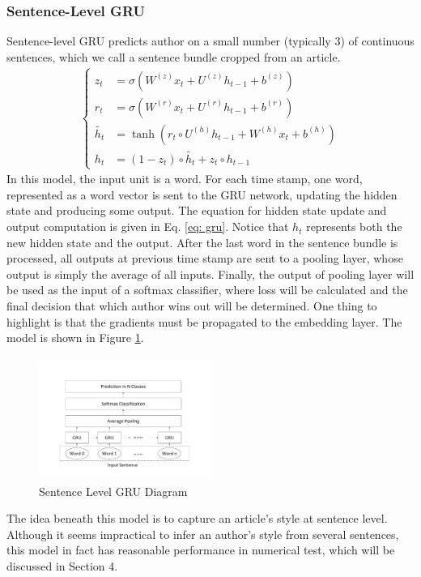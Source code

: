 \documentclass{article} %
\begin{document}
\subsubsection{Sentence-Level GRU}
Sentence-level GRU predicts author on a small number (typically 3) of continuous sentences, which we call a sentence bundle cropped from an article. 
%
\begin{align}
\label{eq: gru}
\begin{cases}
z_t&=  \sigma(W^{(z)}x_t + U^{(z)}h_{t - 1} + b^{(z)})\\
r_t&= \sigma(W^{(r)}x_t + U^{(r)}h_{t - 1} + b^{(r)}) \\
\tilde{h_t} &= \tanh(r_t \circ U^{(h)}h_{t-1} + W^{(h)} x_t + b^{(h)}) \\
h_t &= (1 - z_t) \circ \tilde{h_t} + z_t \circ h_{t - 1}
\end{cases}  
\end{align}
%
In this model, the input unit is a word. For each time stamp, one word, represented as a word vector is sent to the GRU network,  updating the hidden state and producing some output. The equation for hidden state update and output computation is given in Eq. \ref{eq: gru}. Notice that $h_t$ represents both the new hidden state and the output. After the last word in the sentence bundle is processed, all outputs at previous time stamp are sent to a pooling layer, whose output is simply the average of all inputs. Finally, the output of pooling layer will be used as the input of a softmax classifier, where loss will be calculated and the final decision that which author wins out will be determined. One thing to highlight is that the gradients must be propagated to the embedding layer. The model is shown in Figure \ref{fig: gru_sentence}.
%
\begin{figure}[H]
\centering
\includegraphics[width = 56mm, height = 40mm]{figures/sentenceLevelGru.pdf} 
\caption{Sentence Level GRU Diagram}
\label{fig: gru_sentence}
\end{figure}
%
The idea beneath this model is to capture an article's style at sentence level. Although it seems impractical to infer an author's style from several sentences, this model in fact has reasonable performance in numerical test, which will be discussed in Section 4. 
\end{document}
